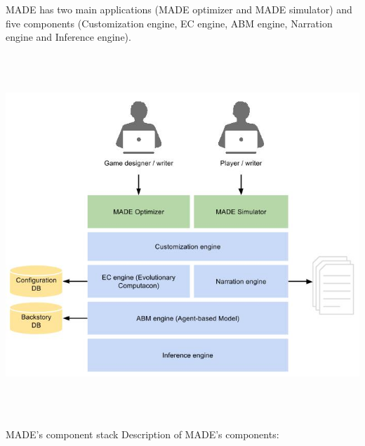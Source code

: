 \documentclass[a4paper]{article}
\begin{document}
MADE has two main applications (MADE optimizer and MADE simulator) and
five components (Customization engine, EC engine, ABM engine, Narration
engine and Inference engine).

\href{http://www.velonuboso.com/made/blog/wp-content/uploads/2015/06/MADEs-architecture-2.jpg}{
\includegraphics[width=16.955cm,height=13.598cm]{makingofmade113-img9.jpg}
}

MADE{\textquoteright}s component stack
Description of MADE{\textquoteright}s components:
\end{document}
